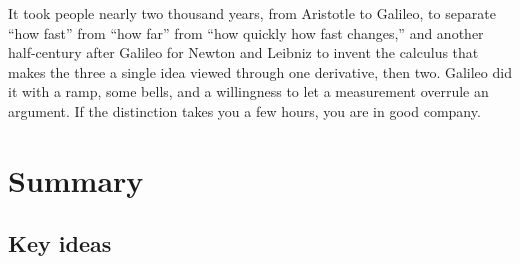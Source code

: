 \documentclass[11pt,twoside,openany]{book}
\begin{document}
It took people nearly two thousand years, from Aristotle to Galileo, to separate ``how fast'' from ``how far'' from ``how quickly how fast changes,'' and another half-century after Galileo for Newton and Leibniz to invent the calculus that makes the three a single idea viewed through one derivative, then two. Galileo did it with a ramp, some bells, and a willingness to let a measurement overrule an argument. If the distinction takes you a few hours, you are in good company.

\section{Summary}

\subsection*{Key ideas}
\end{document}
